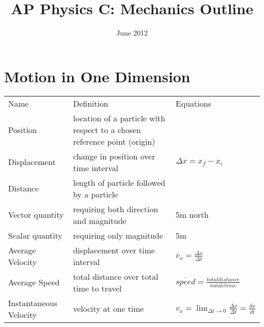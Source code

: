 \documentclass[11pt]{article}
\title{AP Physics C: Mechanics Outline}
\date{June 2012}
\begin{document}
\maketitle
\pagebreak

\section{Motion in One Dimension}
\begin{tabularx}{\textwidth}{l| X l}
    Name             & Definition                                                               & Equations \\
    Position         & location of a particle with respect to a chosen reference point (origin) & \\
    Displacement     & change in position over time interval                                    & $ \Delta x=x_{f} - x_{i} $ \\
    Distance         & length of particle followed by a particle                                & \\
    Vector quantity  & requiring both direction and magnitude                                   & 5m north \\
    Scalar quantity  & requiring only magnitude                                                 & 5m \\
    Average Velocity & displacement over time interval                                          & $ \overline{v}_{x} = \frac{ \Delta x}{ \Delta t } $ \\
    Average Speed    & total distance over total time to travel                                 & $ \overline{speed} = \frac{ total distance }{ totale time } $ \\
    Instantaneous Velocity & velocity at one time & $ v_{x} = \lim_{ \Delta t \to 0} \frac{\Delta x}{\Delta t} = \frac{dx}{dt} $ \\
\end{tabularx}
\end{document}
